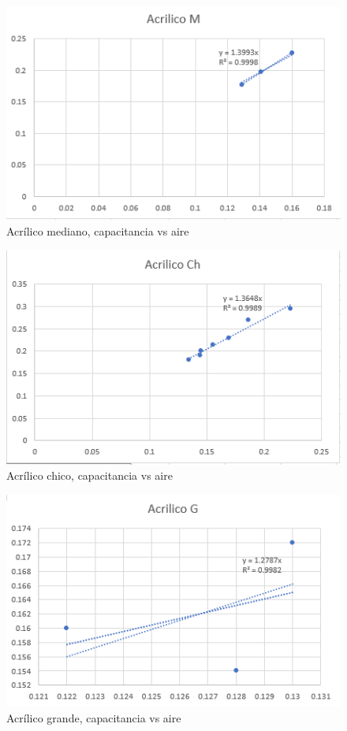 \documentclass{article}
\begin{document}
\begin{figure}[H]
	\centering	
	\includegraphics[scale=0.6]{../imgs/AcrilicoM.png}
	\caption{Acrílico mediano, capacitancia vs aire}
	\label{fig:1}
\end{figure}

\begin{figure}[H]
	\centering	
	\includegraphics[scale=0.6]{../imgs/acrilicoch.png}
	\caption{Acrílico chico, capacitancia vs aire}
	\label{fig:2}
\end{figure}

\begin{figure}[H]
	\centering	
	\includegraphics[scale=0.6]{../imgs/acrilicog.png}
	\caption{Acrílico grande, capacitancia vs aire}
	\label{fig:3}
\end{figure}
\end{document}
